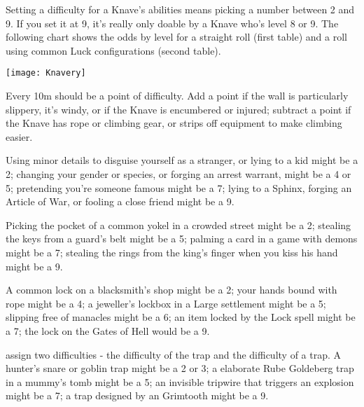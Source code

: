 {  Setting a difficulty for a Knave's  abilities means picking a number between 2 and 9. If you set it at 9, it's really only doable by a Knave who's level 8 or 9.  The following chart shows the odds by level for a straight roll (first table) and a roll using common Luck configurations (second table).  

  \begin{center}
  \texttt{[image: Knavery]}
  \end{center}

  \begin{multicols}{2}


   Every 10m should be a point of difficulty.  Add a point if the wall is particularly slippery, it's windy, or if the Knave is encumbered or injured; subtract a point if the Knave has rope or climbing gear, or strips off equipment to make climbing easier.

      Using minor details to disguise yourself as a stranger, or lying to a kid might be a 2; changing your gender or species, or forging an arrest warrant, might be a 4 or 5; pretending you're someone famous might be a 7; lying to a Sphinx, forging an Article of War, or fooling a close friend might be a 9.



     Picking the pocket of a common yokel in a crowded street might be a 2; stealing the keys from a guard's belt might be a 5; palming a card in a game with demons might be a 7; stealing the rings from the king's finger when you kiss his hand might be a 9.




       A common lock on a blacksmith's shop might be a 2; your hands bound with rope might be a 4; a jeweller's lockbox in a Large settlement might be a 5; slipping free of manacles might be a 6;  an item locked by the Lock spell might be a 7; the lock on the Gates of Hell would be a 9.

        assign two difficulties - the difficulty of  the trap and the difficulty of  a trap.  A hunter's snare or goblin trap might be a 2 or 3; a elaborate Rube Goldeberg trap in a mummy's tomb might be a 5; an invisible tripwire that triggers an explosion might be a 7; a trap designed by an Grimtooth might be a 9.


\end{multicols}}
